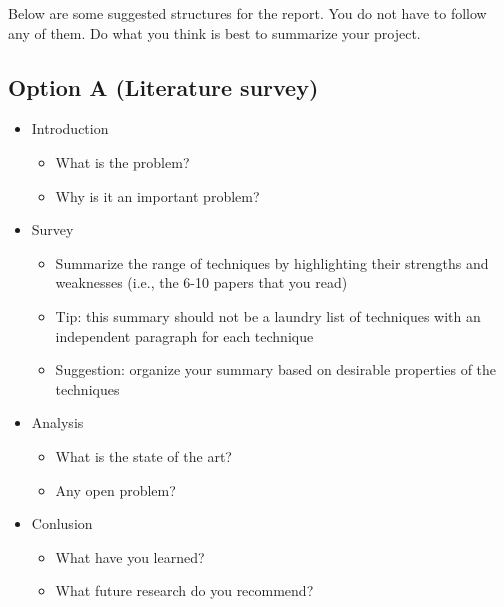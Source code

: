 \documentclass{article}
\begin{document}
Below are some suggested structures for the report. You do not have to follow any of them. Do what you think is best to summarize your project.
\subsection*{Option A (Literature survey)}
\begin{itemize}
\item Introduction
	\begin{itemize}
	\item What is the problem?
	\item Why is it an important problem?
	\end{itemize}
\item Survey
	\begin{itemize}
	\item Summarize the range of techniques by highlighting their strengths and weaknesses (i.e., the 6-10 papers that you read)
	\item Tip: this summary should not be a laundry list of techniques with an independent paragraph for each technique
	\item Suggestion: organize your summary based on desirable properties of the techniques
	\end{itemize}
\item Analysis
	\begin{itemize}
	\item What is the state of the art?
	\item Any open problem?
	\end{itemize}
\item Conlusion
	\begin{itemize}
	\item What have you learned?
	\item What future research do you recommend?
	\end{itemize}
\end{itemize}
\end{document}
